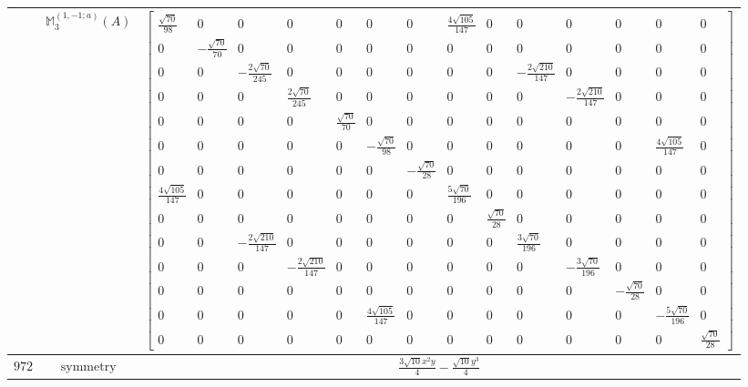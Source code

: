 \documentclass[fleqn,8pt,landscape]{jsarticle}
\begin{document}
\begin{longtable}{ccc}
$  $ & $ \mathbb{M}_{3}^{(1,-1;a)}(A) $ & $ \begin{bmatrix} \frac{\sqrt{70}}{98} & 0 & 0 & 0 & 0 & 0 & 0 & \frac{4 \sqrt{105}}{147} & 0 & 0 & 0 & 0 & 0 & 0 \\ 0 & - \frac{\sqrt{70}}{70} & 0 & 0 & 0 & 0 & 0 & 0 & 0 & 0 & 0 & 0 & 0 & 0 \\ 0 & 0 & - \frac{2 \sqrt{70}}{245} & 0 & 0 & 0 & 0 & 0 & 0 & - \frac{2 \sqrt{210}}{147} & 0 & 0 & 0 & 0 \\ 0 & 0 & 0 & \frac{2 \sqrt{70}}{245} & 0 & 0 & 0 & 0 & 0 & 0 & - \frac{2 \sqrt{210}}{147} & 0 & 0 & 0 \\ 0 & 0 & 0 & 0 & \frac{\sqrt{70}}{70} & 0 & 0 & 0 & 0 & 0 & 0 & 0 & 0 & 0 \\ 0 & 0 & 0 & 0 & 0 & - \frac{\sqrt{70}}{98} & 0 & 0 & 0 & 0 & 0 & 0 & \frac{4 \sqrt{105}}{147} & 0 \\ 0 & 0 & 0 & 0 & 0 & 0 & - \frac{\sqrt{70}}{28} & 0 & 0 & 0 & 0 & 0 & 0 & 0 \\ \frac{4 \sqrt{105}}{147} & 0 & 0 & 0 & 0 & 0 & 0 & \frac{5 \sqrt{70}}{196} & 0 & 0 & 0 & 0 & 0 & 0 \\ 0 & 0 & 0 & 0 & 0 & 0 & 0 & 0 & \frac{\sqrt{70}}{28} & 0 & 0 & 0 & 0 & 0 \\ 0 & 0 & - \frac{2 \sqrt{210}}{147} & 0 & 0 & 0 & 0 & 0 & 0 & \frac{3 \sqrt{70}}{196} & 0 & 0 & 0 & 0 \\ 0 & 0 & 0 & - \frac{2 \sqrt{210}}{147} & 0 & 0 & 0 & 0 & 0 & 0 & - \frac{3 \sqrt{70}}{196} & 0 & 0 & 0 \\ 0 & 0 & 0 & 0 & 0 & 0 & 0 & 0 & 0 & 0 & 0 & - \frac{\sqrt{70}}{28} & 0 & 0 \\ 0 & 0 & 0 & 0 & 0 & \frac{4 \sqrt{105}}{147} & 0 & 0 & 0 & 0 & 0 & 0 & - \frac{5 \sqrt{70}}{196} & 0 \\ 0 & 0 & 0 & 0 & 0 & 0 & 0 & 0 & 0 & 0 & 0 & 0 & 0 & \frac{\sqrt{70}}{28} \end{bmatrix} $ \\ \hline
$ 972 $ & $ \text{symmetry} $ & $ \frac{3 \sqrt{10} x^{2} y}{4} - \frac{\sqrt{10} y^{3}}{4} $ \\

\end{longtable}
\end{document}
